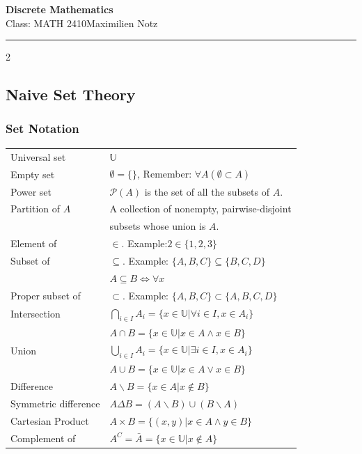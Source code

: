 \documentclass[5pt]{article}
\newcommand{\universalSet}{\mathbb{U}}
\begin{document}
\newtheorem{theorem}{Theorem}
\newtheorem{lemma}{Lemma}
\newtheorem{properties}{Properties}
\newtheorem{axiom}{Axiom}


\begin{center}
     \Large{\textbf{Discrete Mathematics}}\\
     \small{Class: MATH 2410}\hfill\small{\textcopyright Maximilien Notz \the\year{}}
     \noindent\rule{20.2cm}{0.4pt}
\end{center}


\begin{multicols}{2}
\setcounter{secnumdepth}{0}


\subsection{Naive Set Theory}
\subsubsection{Set Notation}
\begin{tabular}{ll}
    Universal set           & $\universalSet$\\
    Empty set               & $\emptyset=\{\}$, Remember: $\forall A (\emptyset\subset A)$\\
    Power set               & $\mathcal{P}(A)$ is the set of all the subsets of $A$.\\
    Partition of $A$        & A collection of nonempty, \small{pairwise-disjoint}\\
                            & subsets whose union is $A$.\\
    Element of              & $\in$. Example:$2\in\{1,2,3\}$\\
    Subset of               & $\subseteq$. Example: $\{A, B,C\}\subseteq\{B,C,D\}$\\
                            & $A\subseteq B \Leftrightarrow\forall x$\\
    Proper subset of        & $\subset$. Example: $\{A, B,C\}\subset\{A, B,C,D\}$\\
    Intersection            & $\bigcap_{i\in I}A_i=\{x\in\universalSet|\forall i\in I, x\in A_i\}$\\
                            & $A\cap B=\{x\in\universalSet|x\in A\land x\in B\}$\\
    Union                   & $\bigcup_{i\in I}A_i=\{x\in\universalSet|\exists i\in I, x\in A_i\}$\\
                            & $A\cup B=\{x\in\universalSet|x\in A\lor x\in B\}$\\
    Difference              & $A\backslash B=\{x\in A|x\notin B\}$\\
    Symmetric difference    & $A\Delta B=(A\backslash B)\cup(B\backslash A)$\\
    Cartesian Product       & $A\times B=\{(x,y)|x\in A\land y \in B\}$\\
    Complement of           & $A^C=\bar{A}=\{x\in\universalSet|x\notin A\}$\\
\end{tabular}


\end{multicols}
\end{document}
